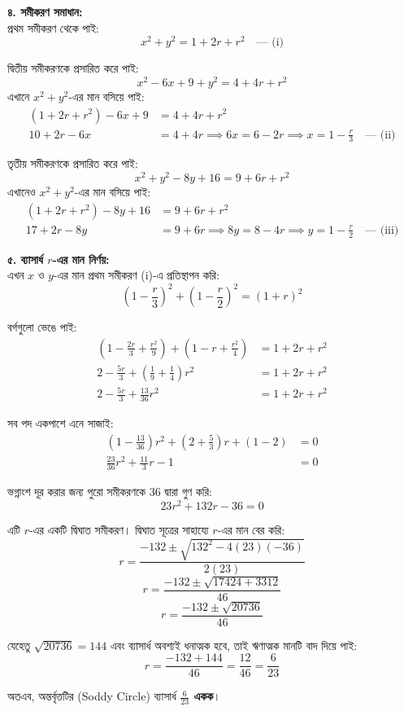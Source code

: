 \documentclass[12pt, a4paper]{article}
\begin{document}
\begin{tcolorbox}[solutionbox={সমাধান (Solution)}]
    \vspace{0.5em}
    \textbf{৪. সমীকরণ সমাধান:} \\
    প্রথম সমীকরণ থেকে পাই:
    \[ x^2 + y^2 = 1 + 2r + r^2 \quad \text{--- (i)} \]
    
    দ্বিতীয় সমীকরণকে প্রসারিত করে পাই:
    \[ x^2 - 6x + 9 + y^2 = 4 + 4r + r^2 \]
    এখানে $x^2 + y^2$-এর মান বসিয়ে পাই:
    \begin{align*}
        (1 + 2r + r^2) - 6x + 9 &= 4 + 4r + r^2 \\
        10 + 2r - 6x &= 4 + 4r \implies 6x = 6 - 2r \implies x = 1 - \frac{r}{3} \quad \text{--- (ii)}
    \end{align*}
    
    তৃতীয় সমীকরণকে প্রসারিত করে পাই:
    \[ x^2 + y^2 - 8y + 16 = 9 + 6r + r^2 \]
    এখানেও   $x^2 + y^2$-এর মান বসিয়ে পাই:
    \begin{align*}
        (1 + 2r + r^2) - 8y + 16 &= 9 + 6r + r^2 \\
        17 + 2r - 8y &= 9 + 6r \implies 8y = 8 - 4r \implies y = 1 - \frac{r}{2} \quad \text{--- (iii)}
    \end{align*}
    
    \vspace{0.5em}
    \textbf{৫. ব্যাসার্ধ $r$-এর মান নির্ণয়:} \\
    এখন $x$ ও         $y$-এর মান প্রথম সমীকরণ   (i)-এ প্রতিস্থাপন করি:
    \[ \left(1 - \frac{r}{3}\right)^2 + \left(1 - \frac{r}{2}\right)^2 = (1 + r)^2 \]
    
    বর্গগুলো ভেঙে পাই:
    \begin{align*}
        \left(1 - \frac{2r}{3} + \frac{r^2}{9}\right) + \left(1 - r + \frac{r^2}{4}\right) &= 1 + 2r + r^2 \\
        2 - \frac{5r}{3} + \left(\frac{1}{9} + \frac{1}{4}\right)r^2 &= 1 + 2r + r^2 \\
        2 - \frac{5r}{3} + \frac{13}{36}r^2 &= 1 + 2r + r^2
    \end{align*}
    
    সব পদ একপাশে এনে সাজাই:
    \begin{align*}
        \left(1 - \frac{13}{36}\right)r^2 + \left(2 + \frac{5}{3}\right)r + (1 - 2) &= 0 \\
        \frac{23}{36}r^2 + \frac{11}{3}r - 1 &= 0
    \end{align*}
    
    ভগ্নাংশ দূর করার জন্য পুরো সমীকরণকে      $36$ দ্বারা গুণ করি:
    \[ 23r^2 + 132r - 36 = 0 \]
    
    এটি $r$-এর একটি দ্বিঘাত সমীকরণ। দ্বিঘাত সূত্রের সাহায্যে   $r$-এর মান বের করি:
    \[ r = \frac{-132 \pm \sqrt{132^2 - 4(23)(-36)}}{2(23)} \]
    \[ r = \frac{-132 \pm \sqrt{17424 + 3312}}{46} \]
    \[ r = \frac{-132 \pm \sqrt{20736}}{46} \]
    
    যেহেতু $\sqrt{20736} = 144$ এবং ব্যাসার্ধ অবশ্যই ধনাত্মক হবে, তাই ঋণাত্মক মানটি বাদ দিয়ে পাই:
    \[ r = \frac{-132 + 144}{46} = \frac{12}{46} = \frac{6}{23} \]
    
    অতএব, অন্তর্বৃত্তটির (Soddy Circle) ব্যাসার্ধ \textbf{$\frac{6}{23}$ একক}।
\end{tcolorbox}
\end{document}
